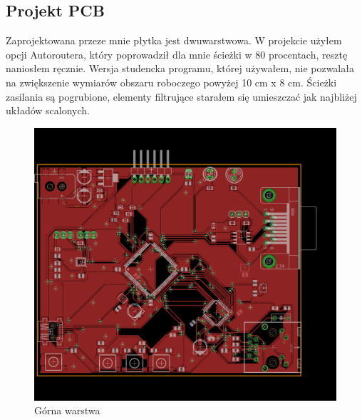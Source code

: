 \documentclass[12pt]{article}
\begin{document}
\subsection{Projekt PCB}
Zaprojektowana przeze mnie płytka jest dwuwarstwowa. W projekcie użyłem opcji Autoroutera, który poprowadził dla mnie ścieżki w 80 procentach, resztę naniosłem ręcznie. Wersja studencka programu, której używałem,  nie pozwalała na zwiększenie wymiarów obszaru roboczego powyżej 10 cm x 8 cm. Ścieżki zasilania są pogrubione, elementy filtrujące starałem się umieszczać jak najbliżej układów scalonych.
\begin{figure}[H]
\begin{center}
\includegraphics[width=1\textwidth]{figures/top.png}
\caption{Górna warstwa}
\end{center}
\end{figure}
\end{document}
